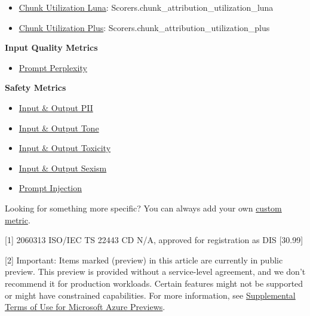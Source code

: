\documentclass[
  letterpaper,
  DIV=11,
  numbers=noendperiod,
  oneside]{scrreprt}
\providecommand{\tightlist}{%
  \setlength{\itemsep}{0pt}\setlength{\parskip}{0pt}}
\begin{document}
\begin{tcolorbox}
\begin{itemize}
  \begin{itemize}
  \item
    \href{https://docs.galileo.ai/galileo/gen-ai-studio-products/galileo-guardrail-metrics/chunk-utilization/chunk-utilization-luna}{Chunk
    Utilization Luna}: Scorers.chunk\_attribution\_utilization\_luna
  \item
    \href{https://docs.galileo.ai/galileo/gen-ai-studio-products/galileo-guardrail-metrics/chunk-utilization/chunk-utilization-plus}{Chunk
    Utilization Plus}: Scorers.chunk\_attribution\_utilization\_plus
  \end{itemize}
\end{itemize}

\textbf{Input Quality Metrics}

\begin{itemize}
\tightlist
\item
  \href{https://docs.galileo.ai/galileo/gen-ai-studio-products/galileo-guardrail-metrics/prompt-perplexity}{Prompt
  Perplexity}
\end{itemize}

\textbf{Safety Metrics}

\begin{itemize}
\item
  \href{https://docs.galileo.ai/galileo/gen-ai-studio-products/galileo-guardrail-metrics/private-identifiable-information}{Input
  \& Output PII}
\item
  \href{https://docs.galileo.ai/galileo/gen-ai-studio-products/galileo-guardrail-metrics/tone}{Input
  \& Output Tone}
\item
  \href{https://docs.galileo.ai/galileo/gen-ai-studio-products/galileo-guardrail-metrics/toxicity}{Input
  \& Output Toxicity}
\item
  \href{https://docs.galileo.ai/galileo/gen-ai-studio-products/galileo-guardrail-metrics/sexism}{Input
  \& Output Sexism}
\item
  \href{https://docs.galileo.ai/galileo/gen-ai-studio-products/galileo-guardrail-metrics/prompt-injection}{Prompt
  Injection}
\end{itemize}

Looking for something more specific? You can always add your own
\href{https://docs.galileo.ai/galileo/gen-ai-studio-products/galileo-observe/how-to/registering-and-using-custom-metrics}{custom
metric}.

{[}1{]} 2060313 ISO/IEC TS 22443 CD N/A, approved for registration as
DIS {[}30.99{]}

{[}2{]} Important: Items marked (preview) in this article are currently
in public preview. This preview is provided without a service-level
agreement, and we don't recommend it for production workloads. Certain
features might not be supported or might have constrained capabilities.
For more information, see
\href{https://azure.microsoft.com/support/legal/preview-supplemental-terms/}{Supplemental
Terms of Use for Microsoft Azure Previews}.


\end{tcolorbox}
\end{document}
